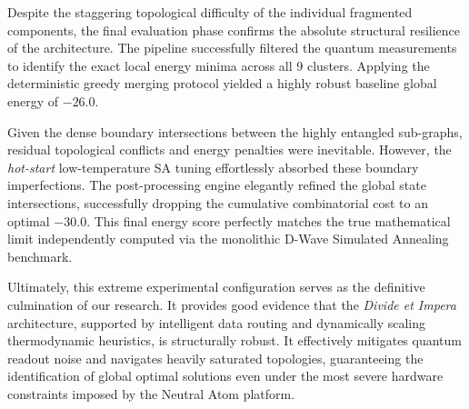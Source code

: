 \begin{table}[H]
    \centering
    \caption{Four-tiered adaptive thermodynamic hyperparameter configuration deployed for the dense $100\times100$ QUBO instance.}
    \label{tab:sa_params_100x100_dense}
\end{table}

Despite the staggering topological difficulty of the individual fragmented components, the final evaluation phase confirms the absolute structural resilience of the architecture. The pipeline successfully filtered the quantum measurements to identify the exact local energy minima across all 9 clusters. Applying the deterministic greedy merging protocol yielded a highly robust baseline global energy of $-26.0$. 

Given the dense boundary intersections between the highly entangled sub-graphs, residual topological conflicts and energy penalties were inevitable. However, the \textit{hot-start} low-temperature SA tuning effortlessly absorbed these boundary imperfections. The post-processing engine elegantly refined the global state intersections, successfully dropping the cumulative combinatorial cost to an optimal $-30.0$. This final energy score perfectly matches the true mathematical limit independently computed via the monolithic D-Wave Simulated Annealing benchmark.

Ultimately, this extreme experimental configuration serves as the definitive culmination of our research. It provides good evidence that the \textit{Divide et Impera} architecture, supported by intelligent data routing and dynamically scaling thermodynamic heuristics, is structurally robust. It effectively mitigates quantum readout noise and navigates heavily saturated topologies, guaranteeing the identification of global optimal solutions even under the most severe hardware constraints imposed by the Neutral Atom platform.

